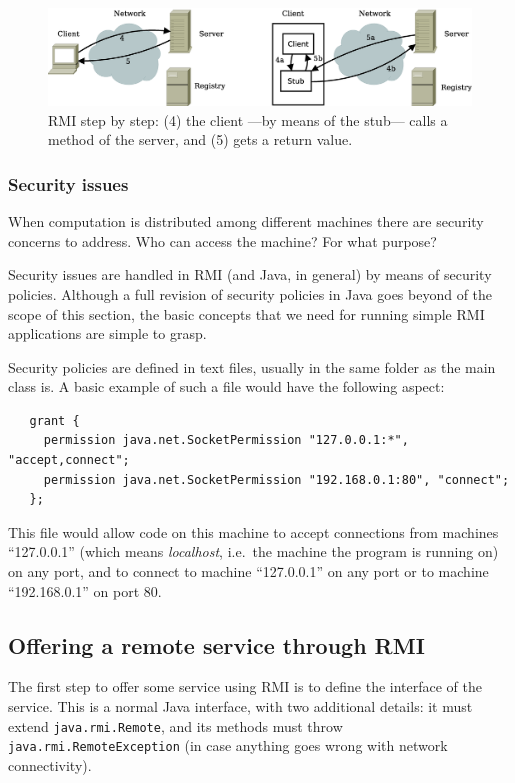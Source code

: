 \begin{figure}[hbtp]
  \centering
  \includegraphics[width=\textwidth]{gfx/rmi-steps3}
  \caption{RMI step by step: (4) the client ---by means of the stub---
  calls a method of the server, and (5) gets a return value. }
  \label{fig:rmiflow3}
\end{figure}

\subsubsection*{Security issues}
\label{sec:security}

When computation is distributed among different machines there are
security concerns to address. Who can access the machine? For what
purpose? 

Security issues are handled in RMI (and Java, in general) by means of security
policies. Although a full revision of security policies in Java goes
beyond of the scope of this section, the basic concepts that we need
for running simple RMI applications are simple to grasp. 

Security policies are defined in text files, usually in the same
folder as the main class is. A basic example of such a file would
have the following aspect: 

\begin{verbatim}
   grant {
     permission java.net.SocketPermission "127.0.0.1:*", "accept,connect";
     permission java.net.SocketPermission "192.168.0.1:80", "connect";
   };
\end{verbatim}

This file would allow code on this machine to accept connections from
machines ``127.0.0.1'' (which
means \emph{localhost}, i.e.~the machine the program is running on) on
any port, and to connect to machine ``127.0.0.1'' on any port or to
machine ``192.168.0.1'' on port 80. 

\subsection{Offering a remote service through RMI}
\label{sec:offer-remote-serv}

The first step to offer some service using RMI is to define the
interface of the service. This is a normal Java interface, with two
additional details: it must extend \verb+java.rmi.Remote+, and its
methods must throw \verb+java.rmi.RemoteException+ (in case anything
goes wrong with network connectivity). 

